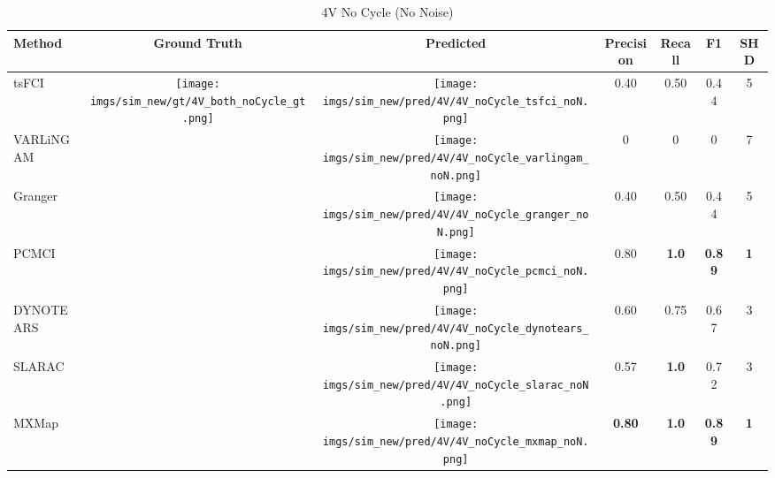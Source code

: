 \begin{table}[htb]
\begin{tabular}{l|c|c|c|c|c|c}
Method    & Ground Truth      & Predicted & Precision     & Recall       & F1            & SHD        \\ \hline
tsFCI     & \multirow{7}{*}[-5em]{\begin{minipage}{.17\linewidth} \centering \texttt{[image: imgs/sim\_new/gt/4V\_both\_noCycle\_gt.png]} \end{minipage}} & \begin{minipage}{.17\linewidth} \centering \texttt{[image: imgs/sim\_new/pred/4V/4V\_noCycle\_tsfci\_noN.png]} \end{minipage}   & 0.40          & 0.50         & 0.44          & 5          \\
VARLiNGAM &                   & \begin{minipage}{.17\linewidth} \centering \texttt{[image: imgs/sim\_new/pred/4V/4V\_noCycle\_varlingam\_noN.png]} \end{minipage} & 0             & 0            & 0             & 7          \\
Granger   &                   & \begin{minipage}{.17\linewidth} \centering \texttt{[image: imgs/sim\_new/pred/4V/4V\_noCycle\_granger\_noN.png]} \end{minipage} & 0.40          & 0.50         & 0.44          & 5          \\
PCMCI     &                   & \begin{minipage}{.17\linewidth} \centering \texttt{[image: imgs/sim\_new/pred/4V/4V\_noCycle\_pcmci\_noN.png]} \end{minipage} & 0.80          & \textbf{1.0} & \textbf{0.89} & \textbf{1} \\
DYNOTEARS &                   & \begin{minipage}{.17\linewidth} \centering \texttt{[image: imgs/sim\_new/pred/4V/4V\_noCycle\_dynotears\_noN.png]} \end{minipage} & 0.60          & 0.75         & 0.67          & 3          \\
SLARAC    &                   & \begin{minipage}{.17\linewidth} \centering \texttt{[image: imgs/sim\_new/pred/4V/4V\_noCycle\_slarac\_noN.png]} \end{minipage}  & 0.57          & \textbf{1.0} & 0.72          & 3          \\ \cline{1-1} \cline{3-7} 
MXMap     &                   &  \begin{minipage}{.17\linewidth} \centering \texttt{[image: imgs/sim\_new/pred/4V/4V\_noCycle\_mxmap\_noN.png]} \end{minipage} & \textbf{0.80} & \textbf{1.0} & \textbf{0.89} & \textbf{1}
\end{tabular}
\caption{4V No Cycle (No Noise)}
\label{tab:4V_noCycle_noN}
\end{table}

